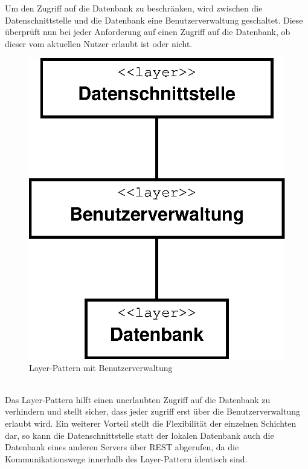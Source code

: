 Um den Zugriff auf die Datenbank zu beschränken, wird zwischen die Datenschnittstelle und die Datenbank eine Benutzerverwaltung geschaltet. Diese überprüft nun bei jeder Anforderung auf einen Zugriff auf die Datenbank, ob dieser vom aktuellen Nutzer erlaubt ist oder nicht.
\begin{figure}
	\vspace{-15pt}
\begin{center}
\includegraphics[width=1\linewidth]{Grafik/Diagramm/Layer}
\end{center}
\vspace{-15pt}
\caption[Layer-Klassen]{Layer-Pattern mit Benutzerverwaltung}
\label{fig:Layer}
\end{figure}\\
Das Layer-Pattern hilft einen unerlaubten Zugriff auf die Datenbank zu verhindern und stellt sicher, dass jeder zugriff erst über die Benutzerverwaltung erlaubt wird. Ein weiterer Vorteil stellt die Flexibilität der einzelnen Schichten dar, so kann die Datenschnittstelle statt der lokalen Datenbank auch die Datenbank eines anderen Servers über REST abgerufen, da die Kommunikationswege innerhalb des Layer-Pattern identisch sind.
